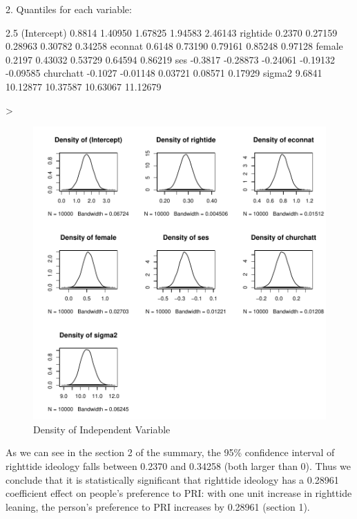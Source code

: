 \documentclass[12pt]{article}
\begin{document}
\begin{enumerate}
\begin{Schunk}
\begin{Soutput}
2. Quantiles for each variable:

               2.5%
(Intercept)  0.8814  1.40950  1.67825  1.94583  2.46143
rightide     0.2370  0.27159  0.28963  0.30782  0.34258
econnat      0.6148  0.73190  0.79161  0.85248  0.97128
female       0.2197  0.43032  0.53729  0.64594  0.86219
ses         -0.3817 -0.28873 -0.24061 -0.19132 -0.09585
churchatt   -0.1027 -0.01148  0.03721  0.08571  0.17929
sigma2       9.6841 10.12877 10.37587 10.63067 11.12679
\end{Soutput}
\begin{Sinput}
> 
\end{Sinput}
\end{Schunk}


\begin{figure}[htbp]
  \begin{center}
    \includegraphics[width=\textwidth]{PS3-f1.pdf}
  \end{center}
  \caption{Density of Independent Variable}
  \label{f:f1}
\end{figure}

As we can see in the section 2 of the summary, the 95\% confidence interval of righttide ideology falls between 0.2370 and 0.34258 (both larger than 0). Thus we conclude that it is statistically significant that righttide ideology has a 0.28961 coefficient effect on people's preference to PRI: with one unit increase in righttide leaning, the person's preference to PRI increases by 0.28961 (section 1).




\end{enumerate}
\end{document}
